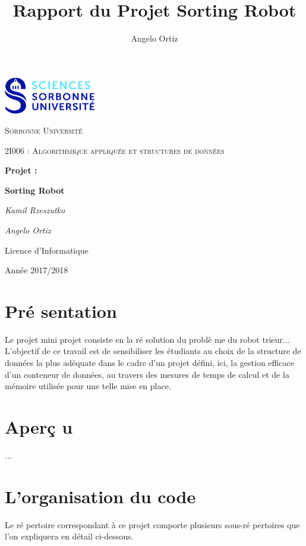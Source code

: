 \documentclass[12pt,a4paper]{article}
\author{Angelo Ortiz}
\title{Rapport du Projet Sorting Robot}
\begin{document}
\begin{titlepage}
  \centering
  \includegraphics[width=0.30\textwidth]{logo.jpg}\par\vspace{1cm}
  {\scshape\LARGE Sorbonne Universit\'e\par}
  \vspace{1cm}
  {\scshape\Large 2I006 : Algorithmique appliqu\'ee et structures de 
donn\'ees\par}
  \vspace{1.5cm}
  {\Large \bfseries Projet :\par}
  {\huge\bfseries Sorting Robot\par}
  \vspace{2cm}
  {\Large\itshape Kamil Rzeszutko\par}
  {\Large\itshape Angelo Ortiz\par}
  \vfill
  
  {\large Licence d'Informatique\par}
  {\large Ann\'ee 2017/2018\par}
\end{titlepage}
 
\tableofcontents
  
\newpage
  
\section{Pr\'e sentation}
Le projet mini projet consiste en la r\'e solution du probl\`e me du robot trieur...
L’objectif de ce travail est de sensibiliser les étudiants au choix de la structure de données la plus adéquate dans le cadre d’un projet défini, ici, la gestion efficace d’un conteneur de données, au travers des mesures de temps de calcul et de la mémoire utilisée pour une telle mise en place.
\section{Aper\c{c} u}
...
\newpage
\section{L'organisation du code}
Le r\'e pertoire correspondant \`a ce projet comporte plusieurs sous-r\'e pertoires que l'on expliquera en détail ci-dessous.
\end{document}
